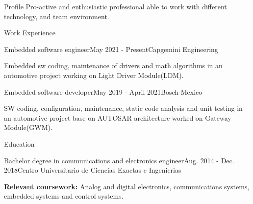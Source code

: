 \documentclass{resume} %
\begin{document}
\begin{rSection}{Profile}
Pro-active and enthusiastic professional able to work with  different technology, and team environment.
\end{rSection}



\begin{rSection}{Work Experience}

\begin{rSubsection}{Embedded software engineer}{May 2021 - Present}{Capgemini Engineering}{}
\item Embedded sw coding, maintenance of drivers and math algorithms in an automotive project working on Light Driver Module(LDM). 
\end{rSubsection}

\begin{rSubsection}{Embedded software developer}{May 2019 - April 2021}{Bosch Mexico}{}
\item SW coding, configuration, maintenance, static code analysis and unit testing in an automotive project base on AUTOSAR architecture worked on Gateway Module(GWM).
\end{rSubsection}

\end{rSection}

\begin{rSection}{Education}
\begin{rSubsection}{Bachelor degree in communications and electronics engineer}{Aug. 2014 - Dec. 2018}{Centro Universitario de Ciencias Exactas e Ingenierias}{}
\item \textbf{Relevant coursework:} Analog and digital electronics, communications systems, embedded systems and control systems.
\end{rSubsection}
\end{rSection}
\end{document}
